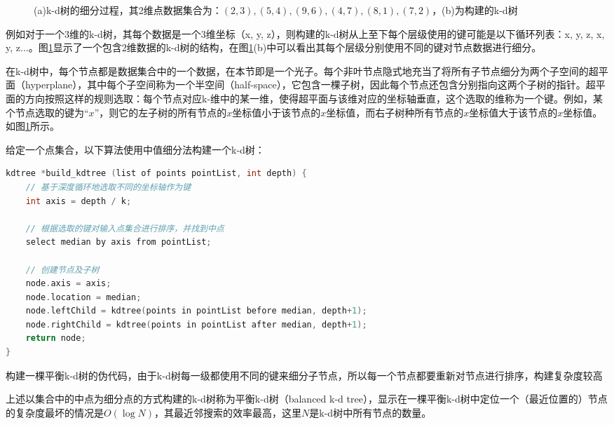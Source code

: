 \begin{figure}
\begin{center}
\begin{subfigure}[b]{.49\textwidth}
		\caption{}
	\end{subfigure}
\end{center}
\caption{(a)k-d树的细分过程，其2维点数据集合为：$(2,3), (5,4), (9,6), (4,7), (8,1), (7,2)$，(b)为构建的k-d树}
\label{f:pm-photon-kd-tree}
\end{figure}

例如对于一个3维的k-d树，其每个数据是一个3维坐标（x, y, z），则构建的k-d树从上至下每个层级使用的键可能是以下循环列表：x, y, z, x, y, z...。图\ref{f:pm-photon-kd-tree}显示了一个包含2维数据的k-d树的结构，在图\ref{f:pm-photon-kd-tree}(b)中可以看出其每个层级分别使用不同的键对节点数据进行细分。

在k-d树中，每个节点都是数据集合中的一个数据，在本节即是一个光子。每个非叶节点隐式地充当了将所有子节点细分为两个子空间的超平面（hyperplane），其中每个子空间称为一个半空间（half-space），它包含一棵子树，因此每个节点还包含分别指向这两个子树的指针。超平面的方向按照这样的规则选取：每个节点对应k-维中的某一维，使得超平面与该维对应的坐标轴垂直，这个选取的维称为一个键。例如，某个节点选取的键为“$x$”，则它的左子树的所有节点的$x$坐标值小于该节点的$x$坐标值，而右子树种所有节点的$x$坐标值大于该节点的$x$坐标值。如图\ref{f:pm-photon-kd-tree}所示。

给定一个点集合，以下算法使用中值细分法构建一个k-d树：

\begin{algorithm}
\begin{lstlisting}[language=C++, mathescape]
kdtree *build_kdtree (list of points pointList, int depth) {
    // 基于深度循环地选取不同的坐标轴作为键
    int axis = depth / k;
        
    // 根据选取的键对输入点集合进行排序，并找到中点
    select median by axis from pointList;
        
    // 创建节点及子树
    node.axis = axis;
    node.location = median;
    node.leftChild = kdtree(points in pointList before median, depth+1);
    node.rightChild = kdtree(points in pointList after median, depth+1);
    return node;
}
\end{lstlisting}
\caption{构建一棵平衡k-d树的伪代码，由于k-d树每一级都使用不同的键来细分子节点，所以每一个节点都要重新对节点进行排序，构建复杂度较高}
\label{a:pm-balancing-photon-map}
\end{algorithm}

上述以集合中的中点为细分点的方式构建的k-d树称为平衡k-d树（balanced k-d tree），\cite{a:MultidimensionalBinarySearchTreesUsedforAssociativeSearching}显示在一棵平衡k-d树中定位一个（最近位置的）节点的复杂度最坏的情况是$O(\log N )$，其最近邻搜索的效率最高，这里$N$是k-d树中所有节点的数量。

